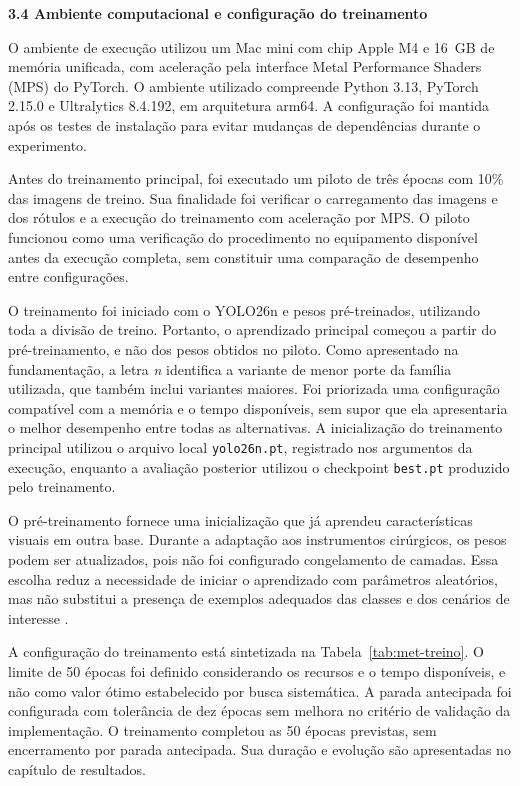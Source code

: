 \vspace{\baselineskip}
{}
\noindent\textbf{3.4 Ambiente computacional e configuração do treinamento}\par
\nobreak\vspace{\baselineskip}\nobreak

O ambiente de execução utilizou um Mac mini com chip Apple M4 e 16~GB de memória unificada, com aceleração pela interface Metal Performance Shaders (MPS) do PyTorch. O ambiente utilizado compreende Python 3.13, PyTorch 2.15.0 e Ultralytics 8.4.192, em arquitetura arm64. A configuração foi mantida após os testes de instalação para evitar mudanças de dependências durante o experimento.

Antes do treinamento principal, foi executado um piloto de três épocas com 10\% das imagens de treino. Sua finalidade foi verificar o carregamento das imagens e dos rótulos e a execução do treinamento com aceleração por MPS. O piloto funcionou como uma verificação do procedimento no equipamento disponível antes da execução completa, sem constituir uma comparação de desempenho entre configurações.

O treinamento foi iniciado com o YOLO26n e pesos pré-treinados, utilizando toda a divisão de treino. Portanto, o aprendizado principal começou a partir do pré-treinamento, e não dos pesos obtidos no piloto. Como apresentado na fundamentação, a letra \textit{n} identifica a variante de menor porte da família utilizada, que também inclui variantes maiores. Foi priorizada uma configuração compatível com a memória e o tempo disponíveis, sem supor que ela apresentaria o melhor desempenho entre todas as alternativas. A inicialização do treinamento principal utilizou o arquivo local \texttt{yolo26n.pt}, registrado nos argumentos da execução, enquanto a avaliação posterior utilizou o checkpoint \texttt{best.pt} produzido pelo treinamento.

O pré-treinamento fornece uma inicialização que já aprendeu características visuais em outra base. Durante a adaptação aos instrumentos cirúrgicos, os pesos podem ser atualizados, pois não foi configurado congelamento de camadas. Essa escolha reduz a necessidade de iniciar o aprendizado com parâmetros aleatórios, mas não substitui a presença de exemplos adequados das classes e dos cenários de interesse \parencite{pytorchTransferencia}.

A configuração do treinamento está sintetizada na Tabela~\ref{tab:met-treino}. O limite de 50 épocas foi definido considerando os recursos e o tempo disponíveis, e não como valor ótimo estabelecido por busca sistemática. A parada antecipada foi configurada com tolerância de dez épocas sem melhora no critério de validação da implementação. O treinamento completou as 50 épocas previstas, sem encerramento por parada antecipada. Sua duração e evolução são apresentadas no capítulo de resultados.

